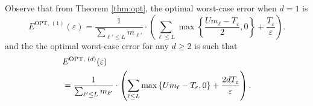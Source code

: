 \documentclass[conference,letterpaper]{IEEEtran}
\theoremstyle{remark}
\theoremstyle{definition}
\begin{document}
Observe that from Theorem \ref{thm:opt}, the optimal worst-case error when $d=1$ is \begin{equation}E^\text{OPT, $(1)$}(\varepsilon)= \frac{1}{\sum_{\ell'\leq L} m_{\ell'}}\cdot\left(\sum_{\ell\leq L} \max\left\{\frac{Um_\ell-T_\varepsilon}{2},0\right\}+\frac{T_\varepsilon}{\varepsilon}\right). \label{eq:eopt1}\end{equation} %
and the the optimal worst-case error for any $d\geq2$ is such that 
\begin{align}& E^\text{OPT, $(d)$}(\varepsilon) \notag\\
	&= \frac{1}{\sum_{\ell'\leq L} m_{\ell'}}\cdot \left( \sum_{\ell\leq L} \max\left\{{Um_\ell-T_\varepsilon},0\right\}+\frac{2dT_\varepsilon}{\varepsilon}\right). \label{eq:eoptd}\end{align} %
\end{document}
